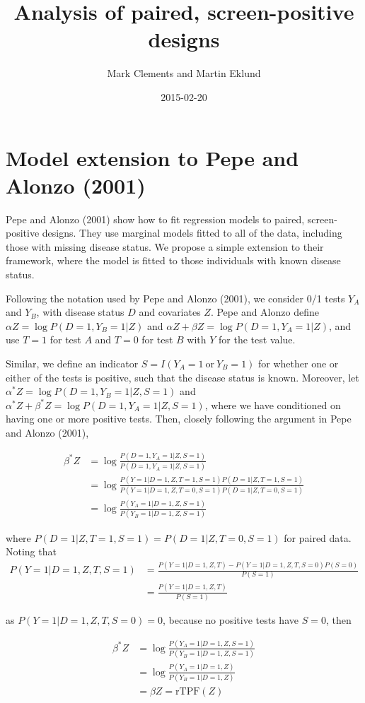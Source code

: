 \documentclass[a4paper]{article}
\title{Analysis of paired, screen-positive designs }
\author{Mark Clements and Martin Eklund}
\date{2015-02-20}
\begin{document}
\maketitle

\section{Model extension to Pepe and Alonzo (2001)}

Pepe and Alonzo (2001) show how to fit regression models to paired, screen-positive designs. They use marginal models fitted to all of the data, including those with missing disease status. We propose a simple extension to their framework, where the model is fitted to those individuals with known disease status.

Following the notation used by Pepe and Alonzo (2001), we consider 0/1 tests $Y_A$ and $Y_B$, with disease status $D$ and covariates $Z$. Pepe and Alonzo define $\alpha Z = \log P(D=1,Y_B=1|Z)$ and $\alpha Z + \beta Z = \log P(D=1,Y_A=1|Z)$, and use $T=1$ for test $A$ and $T=0$ for test $B$ with $Y$ for the test value.

Similar, we define an indicator $S=I(Y_A=1\ \mathrm{or}\ Y_B=1)$ for whether one or either of the tests is positive, such that the disease status is known. Moreover, let  $\alpha^* Z = \log P(D=1,Y_B=1|Z, S=1)$ and $\alpha^* Z + \beta^* Z = \log P(D=1,Y_A=1|Z,S=1)$, where we have conditioned on having one or more positive tests. Then, closely following the argument in Pepe and Alonzo (2001), 

\begin{align*}
  \beta^* Z &= \log \frac{P(D=1,Y_A=1|Z,S=1)}{P(D=1,Y_A=1|Z,S=1)} \\
  &= \log \frac{P(Y=1|D=1,Z,T=1,S=1)P(D=1|Z,T=1,S=1)}{P(Y=1|D=1,Z,T=0,S=1)P(D=1|Z,T=0,S=1)} \\
  &= \log \frac{P(Y_A=1|D=1,Z,S=1)}{P(Y_B=1|D=1,Z,S=1)}
\end{align*}

\noindent where $P(D=1|Z,T=1,S=1)=P(D=1|Z,T=0,S=1)$ for paired data. Noting that
\begin{align*}
  P(Y=1|D=1,Z,T,S=1) &= \frac{P(Y=1|D=1,Z,T)-P(Y=1|D=1,Z,T,S=0)P(S=0)}{P(S=1)} \\
  &= \frac{P(Y=1|D=1,Z,T)}{P(S=1)} 
\end{align*}

\noindent as $P(Y=1|D=1,Z,T,S=0)=0$, because no positive tests have $S=0$, then

\begin{align*}
    \beta^* Z &= \log \frac{P(Y_A=1|D=1,Z,S=1)}{P(Y_B=1|D=1,Z,S=1)} \\
    &= \log \frac{P(Y_A=1|D=1,Z)}{P(Y_B=1|D=1,Z)} \\
    &= \beta Z = \mathrm{rTPF}(Z)
\end{align*}
\end{document}
